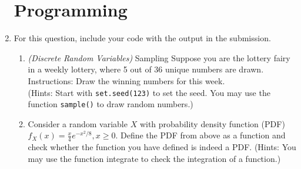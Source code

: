 \documentclass[11pt]{article}
\begin{document}
\begin{enumerate}
\section*{Programming}

	\item For this question, include your code with the output in the submission.
	\begin{enumerate}
		\item \textit{(Discrete Random Variables)} Sampling Suppose you are the lottery fairy in a weekly lottery, where 5 out of 36 unique numbers are drawn.
		Instructions:
		Draw the winning numbers for this week.
		\\(Hints: Start with \texttt{set.seed(123)} to set the seed. You may use the function \texttt{sample()} to draw random numbers.)

		\item Consider a random variable $X$ with probability density function (PDF) $f_X(x) = \frac{x}{4}e^{-x^2/8}, x \ge 0$.
		Define the PDF from above as a function and check whether the function you have defined is indeed a PDF. (Hints: You may use the function integrate to check the integration of a function.)


\end{enumerate}
\end{enumerate}
\end{document}
